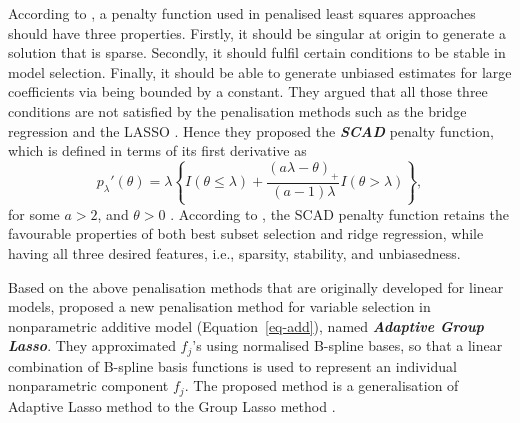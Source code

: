 \documentclass[
  11pt,
  a4paper,
]{article}
\begin{document}
According to \textcite{Fan2001}, a penalty function used in penalised
least squares approaches should have three properties. Firstly, it
should be singular at origin to generate a solution that is sparse.
Secondly, it should fulfil certain conditions to be stable in model
selection. Finally, it should be able to generate unbiased estimates for
large coefficients via being bounded by a constant. They argued that all
those three conditions are not satisfied by the penalisation methods
such as the bridge regression \autocite{Frank1993} and the LASSO
\autocite{Tibshirani1996}. Hence they proposed the \textbf{\emph{SCAD}}
penalty function, which is defined in terms of its first derivative as
\[
 p_{\lambda}'(\theta) = \lambda\left\{I(\theta\le\lambda) + \frac{(a\lambda - \theta)_{+}}{(a - 1)\lambda}I(\theta > \lambda)\right\},
\] for some \(a > 2\), and \(\theta > 0\) \autocite{Fan2001}. According
to \textcite{Fan2001}, the SCAD penalty function retains the favourable
properties of both best subset selection and ridge regression, while
having all three desired features, i.e., sparsity, stability, and
unbiasedness.

Based on the above penalisation methods that are originally developed
for linear models, \textcite{Huang2010} proposed a new penalisation
method for variable selection in nonparametric additive model
(Equation~\ref{eq-add}), named \textbf{\emph{Adaptive Group Lasso}}.
They approximated \(f_{j}\)'s using normalised B-spline bases, so that a
linear combination of B-spline basis functions is used to represent an
individual nonparametric component \(f_{j}\). The proposed method is a
generalisation of Adaptive Lasso method \autocite{Zou2006} to the Group
Lasso method \autocite{Yuan2006}.
\end{document}
